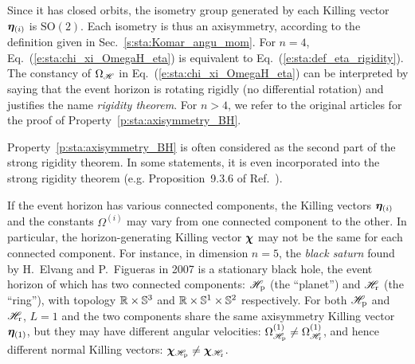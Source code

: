 Since it has closed orbits, the isometry group generated by each Killing vector
$\bm{\eta}_{(i)}$ is $\mathrm{SO}(2)$. Each isometry is thus an
axisymmetry,
according to the definition given in Sec.~\ref{s:sta:Komar_angu_mom}.
For $n=4$, Eq.~(\ref{e:sta:chi_xi_OmegaH_eta}) is
equivalent to Eq.~(\ref{e:sta:def_eta_rigidity}).
The constancy of $\Omega_{\mathscr{H}}$ in Eq.~(\ref{e:sta:chi_xi_OmegaH_eta})
can be interpreted by saying that the event horizon is rotating rigidly
(no differential rotation) and justifies the name \emph{rigidity theorem}.
For $n>4$, we refer
to the original articles \cite{HollaIW07,MoncrI08} for the proof
of Property~\ref{p:sta:axisymmetry_BH}.

\begin{remark}
Property~\ref{p:sta:axisymmetry_BH} is often considered as the second part
of the strong rigidity theorem. In some statements, it is even incorporated
into the strong rigidity theorem (e.g. Proposition~9.3.6 of Ref.~\cite{HawkiE73}).
\end{remark}

\begin{remark}
\label{r:sta:dep_eta_Omega}
If the event horizon has various connected components, the Killing vectors
$\bm{\eta}_{(i)}$ and the constants $\Omega^{(i)}$ may vary from one connected
component to the other. In particular, the horizon-generating Killing vector $\bm{\chi}$
may not be the same for each connected component. For instance,
in dimension $n=5$, the \emph{black saturn}
found by H.~Elvang and P.~Figueras in 2007 \cite{ElvanF07}
is a stationary black hole, the event horizon of which has two connected
components: $\mathscr{H}_{\rm p}$ (the ``planet'') and $\mathscr{H}_{\rm r}$ (the ``ring''),
with topology $\mathbb{R}\times\mathbb{S}^3$ and $\mathbb{R}\times\mathbb{S}^1\times\mathbb{S}^2$ respectively.
For both $\mathscr{H}_{\rm p}$ and $\mathscr{H}_{\rm r}$, $L=1$ and
the two components share the same axisymmetry Killing vector $\bm{\eta}_{(1)}$,
but they may have different angular velocities:
$\Omega^{(1)}_{\mathscr{H}_{\rm p}} \neq \Omega^{(1)}_{\mathscr{H}_{\rm r}}$, and hence
different normal Killing vectors: $\bm{\chi}_{\mathscr{H}_{\rm p}} \neq \bm{\chi}_{\mathscr{H}_{\rm r}}$.
\end{remark}

